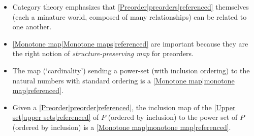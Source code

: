 \begin{itemize}
    \item Category theory emphasizes that \ref{Preorder|preorders|referenced} themselves (each a minature world, composed of many relationships) can be related to one another.
    \item \ref{Monotone map|Monotone maps|referenced} are important because they are the right notion of \emph{structure-preserving map} for preorders.
    \item The map (`cardinality') sending a power-set (with inclusion ordering) to the natural numbers with standard ordering is a \ref{Monotone map|monotone map|referenced}.
    \item Given a \ref{Preorder|preorder|referenced}, the inclusion map of the \ref{Upper set|upper sets|referenced} of $P$ (ordered by inclusion) to the power set of $P$ (ordered by inclusion) is a \ref{Monotone map|monotone map|referenced}.

  \end{itemize}